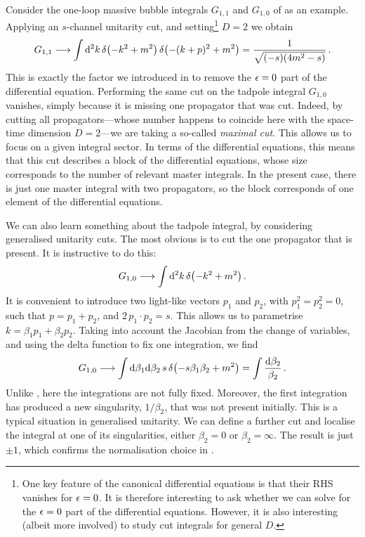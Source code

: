 Consider the one-loop massive bubble integrals $G_{1,1}$ and $G_{1,0}$ of  as an example.
Applying an $s$-channel unitarity cut, and setting\footnote{One key feature of the canonical differential equations is that their RHS vanishes for $\epsilon=0$.
It is therefore interesting to ask whether we can solve for the $\epsilon=0$ part of the differential equations. However, it is also interesting (albeit more involved) to study cut integrals for general $D$.} $D=2$ we obtain
\begin{align}\label{eq:B11cutintegral}
G_{1,1} \longrightarrow \int  \mathrm{d}^{2}k \, \delta\bigl(-k^2+m^2 \bigr) \, \delta\bigl(- (k+p)^2+m^2 \bigr)  = \frac{1}{\sqrt{(-s)(4 m^2-s)}} \,.
\end{align}
This is exactly the factor we introduced in  to remove the $\epsilon=0$ part of the differential equation.
Performing the same cut on the tadpole integral $G_{1,0}$ vanishes, simply because it is
missing one propagator that was cut. 
Indeed, by cutting all propagators---whose number happens to coincide here with the space-time dimension $D=2$---we are taking a so-called \emph{maximal cut}. This allows us to focus on a given integral sector.
In terms of the differential equations, this means that this cut describes a block of the differential equations,
whose size corresponds to the number of relevant master integrals.
In the present case, there is just one master integral with two propagators, so the block corresponds of one element
of the differential equations.

We can also learn something about the tadpole integral, by considering generalised unitarity cuts. 
The most obvious is to cut the one propagator that is present. It is instructive to do this:
\begin{align}\label{eq:B10cutintegral}
G_{1,0} \longrightarrow \int  \mathrm{d}^{2}k \, \delta\bigl(-k^2+m^2\bigr)   \,.
\end{align}
It is convenient to introduce two light-like vectors $p_1$ and $p_2$, with $p_1^2 = p_2^2 = 0$, such that $p=p_1 + p_2$, and $2 \, p_1 \cdot p_2 = s$.
This allows us to parametrise $k= \beta_1 p_1 + \beta_2 p_2$. 
Taking into account the Jacobian from the change of variables, and using the delta function to fix one integration, we find
\begin{align}
G_{1,0} \longrightarrow \int \mathrm{d}\beta_1 \mathrm{d}\beta_2 \, s \, \delta\bigl(-s \beta_1 \beta_2 + m^2\bigr) = \int \frac{\mathrm{d}\beta_2}{\beta_2} \,.
\end{align}
Unlike , here the integrations are not fully fixed.
Moreover, the first integration has produced a new singularity, $1/\beta_2$, that was not present initially.
This is a typical situation in generalised unitarity. 
We can define a further cut and localise the integral at one of its singularities, either $\beta_2= 0$ or $\beta_2 = \infty$.
The result is just $\pm 1$, which confirms the normalisation choice in .


